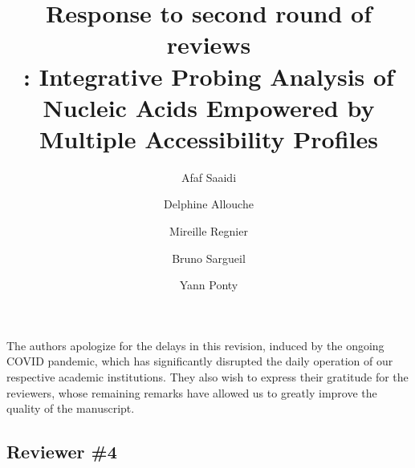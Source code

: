 \documentclass[9pt,hyperref]{article} %
\title{Response to second round of reviews\\[.3em]\OurTool{}:  Integrative Probing Analysis of Nucleic Acids Empowered by Multiple Accessibility Profiles}
\author{
Afaf Saaidi \and
Delphine Allouche \and
Mireille Regnier \and
Bruno Sargueil \and
Yann Ponty}
\date{} %
\begin{document}
\maketitle


The authors apologize for the delays in this revision, induced by the ongoing COVID pandemic, which has significantly disrupted the daily operation of our respective academic institutions. They also wish to express their gratitude for the reviewers, whose remaining remarks have allowed us to greatly improve the quality of the manuscript.


	\subsection{Reviewer \#4}
\end{document}

